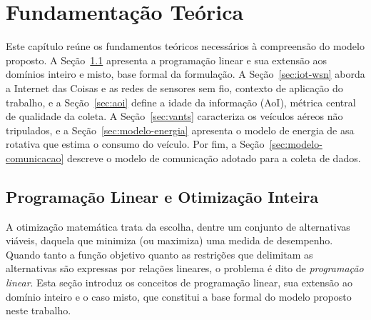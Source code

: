 \chapter{Fundamentação Teórica}
\label{sec:fundamentacao}

Este capítulo reúne os fundamentos teóricos necessários à compreensão do modelo proposto. A Seção~\ref{sec:prog-linear} apresenta a programação linear e sua extensão aos domínios inteiro e misto, base formal da formulação. A Seção~\ref{sec:iot-wsn} aborda a Internet das Coisas e as redes de sensores sem fio, contexto de aplicação do trabalho, e a Seção~\ref{sec:aoi} define a idade da informação (AoI), métrica central de qualidade da coleta. A Seção~\ref{sec:vants} caracteriza os veículos aéreos não tripulados, e a Seção~\ref{sec:modelo-energia} apresenta o modelo de energia de asa rotativa que estima o consumo do veículo. Por fim, a Seção~\ref{sec:modelo-comunicacao} descreve o modelo de comunicação adotado para a coleta de dados.

\section{Programação Linear e Otimização Inteira}
\label{sec:prog-linear}

A otimização matemática trata da escolha, dentre um conjunto de alternativas viáveis, daquela que minimiza (ou maximiza) uma medida de desempenho. Quando tanto a função objetivo quanto as restrições que delimitam as alternativas são expressas por relações lineares, o problema é dito de \emph{programação linear}. Esta seção introduz os conceitos de programação linear, sua extensão ao domínio inteiro e o caso misto, que constitui a base formal do modelo proposto neste trabalho.

